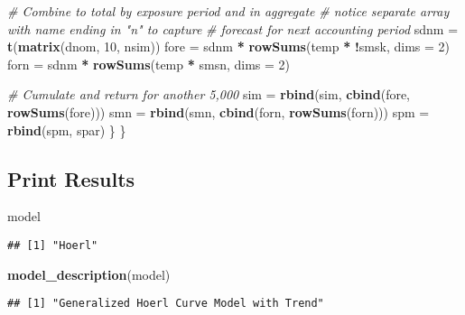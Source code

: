 \documentclass[]{article}
\newenvironment{Shaded}{\begin{snugshade}}{\end{snugshade}}
\newcommand{\CommentTok}[1]{\textcolor[rgb]{0.56,0.35,0.01}{\textit{#1}}}
\newcommand{\DataTypeTok}[1]{\textcolor[rgb]{0.13,0.29,0.53}{#1}}
\newcommand{\DecValTok}[1]{\textcolor[rgb]{0.00,0.00,0.81}{#1}}
\newcommand{\KeywordTok}[1]{\textcolor[rgb]{0.13,0.29,0.53}{\textbf{#1}}}
\newcommand{\NormalTok}[1]{#1}
\newcommand{\OperatorTok}[1]{\textcolor[rgb]{0.81,0.36,0.00}{\textbf{#1}}}
\newcommand{\StringTok}[1]{\textcolor[rgb]{0.31,0.60,0.02}{#1}}
\begin{document}
\begin{Shaded}
\begin{Highlighting}[]
    \CommentTok{# Combine to total by exposure period and in aggregate}
    \CommentTok{# notice separate array with name ending in "n" to capture}
    \CommentTok{# forecast for next accounting period}
\NormalTok{    sdnm =}\StringTok{ }\KeywordTok{t}\NormalTok{(}\KeywordTok{matrix}\NormalTok{(dnom, }\DecValTok{10}\NormalTok{, nsim))}
\NormalTok{    fore =}\StringTok{ }\NormalTok{sdnm }\OperatorTok{*}\StringTok{ }\KeywordTok{rowSums}\NormalTok{(temp }\OperatorTok{*}\StringTok{ }\OperatorTok{!}\NormalTok{smsk, }\DataTypeTok{dims =} \DecValTok{2}\NormalTok{)}
\NormalTok{    forn =}\StringTok{ }\NormalTok{sdnm }\OperatorTok{*}\StringTok{ }\KeywordTok{rowSums}\NormalTok{(temp }\OperatorTok{*}\StringTok{ }\NormalTok{smsn, }\DataTypeTok{dims =} \DecValTok{2}\NormalTok{)}

    \CommentTok{# Cumulate and return for another 5,000}
\NormalTok{    sim =}\StringTok{ }\KeywordTok{rbind}\NormalTok{(sim, }\KeywordTok{cbind}\NormalTok{(fore, }\KeywordTok{rowSums}\NormalTok{(fore)))}
\NormalTok{    smn =}\StringTok{ }\KeywordTok{rbind}\NormalTok{(smn, }\KeywordTok{cbind}\NormalTok{(forn, }\KeywordTok{rowSums}\NormalTok{(forn)))}
\NormalTok{    spm =}\StringTok{ }\KeywordTok{rbind}\NormalTok{(spm, spar)}
\NormalTok{  \}}
\NormalTok{\}}
\end{Highlighting}
\end{Shaded}

\hypertarget{print-results}{%
\subsection{Print Results}\label{print-results}}

\begin{Shaded}
\begin{Highlighting}[]
\NormalTok{model}
\end{Highlighting}
\end{Shaded}

\begin{verbatim}
## [1] "Hoerl"
\end{verbatim}

\begin{Shaded}
\begin{Highlighting}[]
\KeywordTok{model_description}\NormalTok{(model)}
\end{Highlighting}
\end{Shaded}

\begin{verbatim}
## [1] "Generalized Hoerl Curve Model with Trend"
\end{verbatim}
\end{document}
